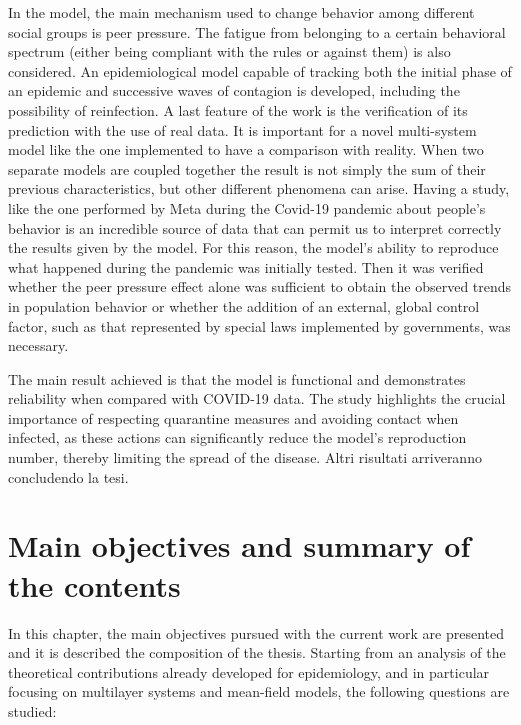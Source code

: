 In the model, the main mechanism used to change behavior among different social groups is peer pressure. The fatigue from belonging to a certain behavioral spectrum (either being compliant with the rules or against them) is also considered. An epidemiological model capable of tracking both the initial phase of an epidemic and successive waves of contagion is developed, including the possibility of reinfection.
A last feature of the work is the verification of its prediction with the use of real data. It is important for a novel multi-system model like the one implemented to have a comparison with reality. When two separate models are coupled together the result is not simply the sum of their previous characteristics, but other different phenomena can arise. Having a study, like the one performed by Meta during the Covid-19 pandemic about people's behavior is an incredible source of data that can permit us to interpret correctly the results given by the model. 
For this reason, the model's ability to reproduce what happened during the pandemic was initially tested. Then it was verified whether the peer pressure effect alone was sufficient to obtain the observed trends in population behavior or whether the addition of an external, global control factor, such as that represented by special laws implemented by governments, was necessary.

The main result achieved is that the model is functional and demonstrates reliability when compared with COVID-19 data. The study highlights the crucial importance of respecting quarantine measures and avoiding contact when infected, as these actions can significantly reduce the model's reproduction number, thereby limiting the spread of the disease. Altri risultati arriveranno concludendo la tesi.

\chapter{Main objectives and summary of the contents}

In this chapter, the main objectives pursued with the current work are presented and it is described the composition of the thesis. 
Starting from an analysis of the theoretical contributions already developed for epidemiology, and in particular focusing on multilayer systems and mean-field models, the following questions are studied:


